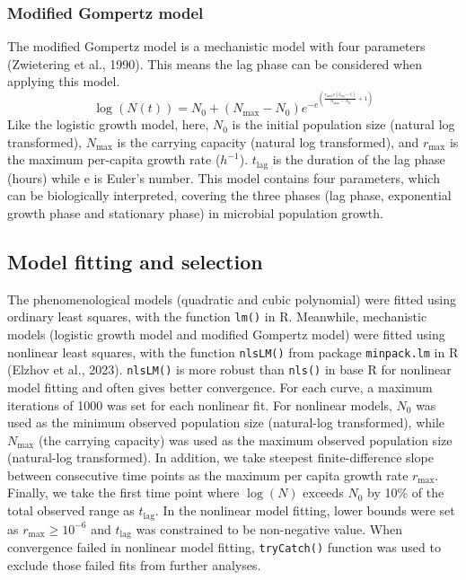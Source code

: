 \documentclass[11pt]{article}
\begin{document}
\subsubsection{Modified Gompertz model}
The modified Gompertz model is a mechanistic model with four parameters (Zwietering et al., 1990). This means the lag phase can be considered when applying this model.
\begin{equation}
\log(N(t)) = N_0 + (N_{\max} - N_0)e^{-e^{\left(\frac{r_{\max}e(t_{\mathrm{lag}}-t)}{N_{\max}-N_0}+1\right)}}
\end{equation}
Like the logistic growth model, here, \(N_0\) is the initial population size (natural log transformed), \(N_{\max}\) is the carrying capacity (natural log transformed), and \(r_{\max}\) is the maximum per-capita growth rate (\(h^{-1}\)). \(t_{\mathrm{lag}}\) is the duration of the lag phase (hours) while e is Euler's number. This model contains four parameters, which can be biologically interpreted, covering the three phases (lag phase, exponential growth phase and stationary phase) in microbial population growth.
\subsection{Model fitting and selection}
The phenomenological models (quadratic and cubic polynomial) were fitted using ordinary least squares, with the function \texttt{lm()} in R. Meanwhile, mechanistic models (logistic growth model and modified Gompertz model) were fitted using nonlinear least squares, with the function \texttt{nlsLM()} from package \texttt{minpack.lm} in R (Elzhov et al., 2023). \texttt{nlsLM()} is more robust than \texttt{nls()} in base R for nonlinear model fitting and often gives better convergence. For each curve, a maximum iterations of 1000 was set for each nonlinear fit. For nonlinear models, \(N_0\) was used as the minimum observed population size (natural-log transformed), while \(N_{\max}\) (the carrying capacity) was used as the maximum observed population size (natural-log transformed). In addition, we take steepest finite-difference slope between consecutive time points as the maximum per capita growth rate \(r_{\max}\). Finally, we take the first time point where \(\log(N)\) exceeds \(N_0\) by 10\% of the total observed range as \(t_{\mathrm{lag}}\). In the nonlinear model fitting, lower bounds were set as \(r_{\max} \ge 10^{-6}\) and \(t_{\mathrm{lag}}\) was constrained to be non-negative value. When convergence failed in nonlinear model fitting, \texttt{tryCatch()} function was used to exclude those failed fits from further analyses.
\end{document}
